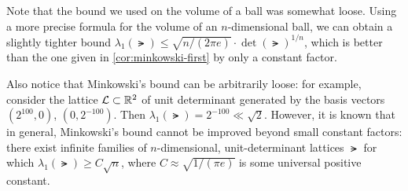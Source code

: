 \documentclass[11pt]{article}
\begin{document}
Note that the bound we used on the volume of a ball was somewhat
loose. Using a more precise formula for the volume of an
$n$-dimensional ball, we can obtain a slightly tighter bound
$\lambda_{1}(\lat) \leq \sqrt{n/(2 \pi e)} \cdot \det(\lat)^{1/n}$,
which is better than the one given in \cref{cor:minkowski-first} by
only a constant factor.

Also notice that Minkowski's bound can be arbitrarily loose: for
example, consider the lattice $\mathcal{L} \subset \mathbb{R}^{2}$ of unit
determinant generated by the basis vectors $(2^{100}, 0)$,
$(0,2^{-100})$.  Then $\lambda_{1}(\lat) = 2^{-100} \ll \sqrt{2}$.
However, it is known that in general, Minkowski's bound cannot be
improved beyond small constant factors: there exist infinite families
of $n$-dimensional, unit-determinant lattices $\lat$ for which
$\lambda_{1}(\lat) \geq C \sqrt{n}$, where $C \approx \sqrt{1/(\pi
  e)}$ is some universal positive constant.
\end{document}
